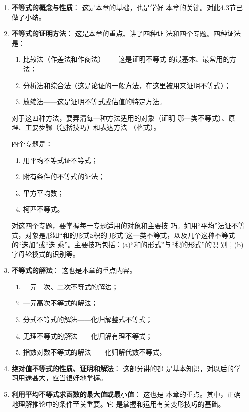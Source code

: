 \begin{enumerate}
    \item \textbf{不等式的概念与性质}：  这是本章的基础，也是学好
本章的关键。对此4.3节已做了小结。
\item \textbf{不等式的证明方法}： 这是本章的重点。讲了四种证
法和四个专题。四种证法是：
\begin{enumerate}[(1)]
\item 比较法（作差法和作商法）——这是证明不等式
的最基本、最常用的方法；
\item 分析法和综合法（这是论证的一般方法，在这里被用来证明不等式）；
\item 放缩法——这是证明不等式或估值的特定方法。
\end{enumerate}

对于这四种方法，要弄清每一种方法适用的对象（证明
哪一类不等式）、原理、主要步骤（包括技巧）和表达方法
（格式）。

四个专题是：
\begin{enumerate}[(1)]
\item 用平均不等式证不等式；
\item 附有条件的不等式的证法；
\item 平方平均数；
\item 柯西不等式。
\end{enumerate}

对这四个专题，要掌握每一专题适用的对象和主要技
巧。如用“平均”法证不等式，对象是形如“和的形式≥积的
形式”这一类不等式，以及几个这种不等式的“迭加”或“迭
乘”。主要技巧包括：(a)“和的形式”与“积的形式”的识
别；(b)字母轮换式的识别等。

\item \textbf{不等式的解法}： 这也是本章的重点内容。
\begin{enumerate}[(1)]
\item 一元一次、二次不等式的解法；
\item 一元高次不等式的解法；
\item 分式不等式的解法——化归解整式不等式；
\item 无理不等式的解法——化归解有理不等式；
\item 指数对数不等式的解法——化归解代数不等式。
\end{enumerate}

\item \textbf{绝对值不等式的性质、证明和解法}： 这部分讲的都
是基本知识，对以后的学习用途甚大，应当很好地掌握。
\item \textbf{利用平均不等式求函数的最大值或最小值}： 这也是
本章的重点。其中，正确地理解推论中的条件至关重要。它
是掌握和运用有关变形技巧的基础。

\end{enumerate}


